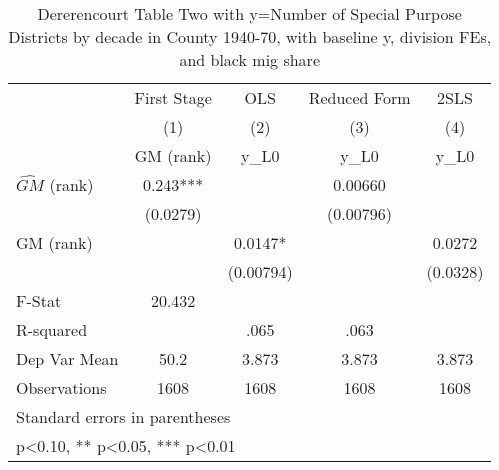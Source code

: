 \begin{table}[htbp]\centering
\def\sym#1{\ifmmode^{#1}\else\(^{#1}\)\fi}
\caption{Dererencourt Table Two with y=Number of Special Purpose Districts by decade in County 1940-70, with baseline y, division FEs, and black mig share}
\begin{tabular}{l*{4}{c}}
\toprule
                    & First Stage   &         OLS   &Reduced Form   &        2SLS   \\
                    &\multicolumn{1}{c}{(1)}&\multicolumn{1}{c}{(2)}&\multicolumn{1}{c}{(3)}&\multicolumn{1}{c}{(4)}\\
                    &\multicolumn{1}{c}{GM  (rank)}&\multicolumn{1}{c}{y\_L0}&\multicolumn{1}{c}{y\_L0}&\multicolumn{1}{c}{y\_L0}\\
\midrule
$\hat{GM}$ (rank)   &       0.243***&               &     0.00660   &               \\
                    &    (0.0279)   &               &   (0.00796)   &               \\
\addlinespace
GM  (rank)          &               &      0.0147*  &               &      0.0272   \\
                    &               &   (0.00794)   &               &    (0.0328)   \\
\midrule
F-Stat              &      20.432   &               &               &               \\
R-squared           &               &        .065   &        .063   &               \\
Dep Var Mean        &        50.2   &       3.873   &       3.873   &       3.873   \\
Observations        &        1608   &        1608   &        1608   &        1608   \\
\bottomrule
\multicolumn{5}{l}{\footnotesize Standard errors in parentheses}\\
\multicolumn{5}{l}{\footnotesize * p<0.10, ** p<0.05, *** p<0.01}\\
\end{tabular}
\end{table}
